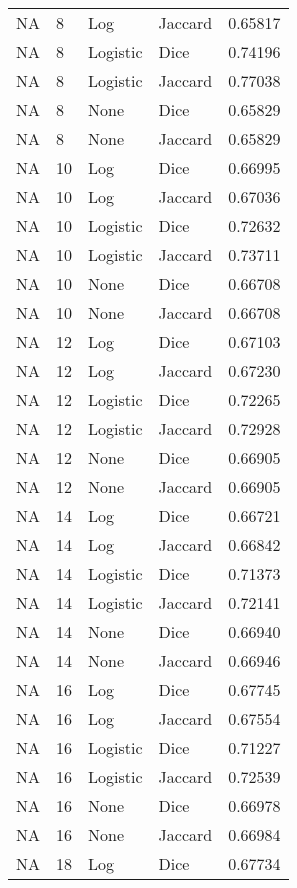 \documentclass{article}
\begin{document}
\begin{center}
\begin{supertabular}{| l | l | l | l | l |}
            NA & 8 & Log & Jaccard & 0.65817 \\
            NA & 8 & Logistic & Dice & 0.74196 \\
            NA & 8 & Logistic & Jaccard & 0.77038 \\
            NA & 8 & None & Dice & 0.65829 \\
            NA & 8 & None & Jaccard & 0.65829 \\
            NA & 10 & Log & Dice & 0.66995 \\
            NA & 10 & Log & Jaccard & 0.67036 \\
            NA & 10 & Logistic & Dice & 0.72632 \\
            NA & 10 & Logistic & Jaccard & 0.73711 \\
            NA & 10 & None & Dice & 0.66708 \\
            NA & 10 & None & Jaccard & 0.66708 \\
            NA & 12 & Log & Dice & 0.67103 \\
            NA & 12 & Log & Jaccard & 0.67230 \\
            NA & 12 & Logistic & Dice & 0.72265 \\
            NA & 12 & Logistic & Jaccard & 0.72928 \\
            NA & 12 & None & Dice & 0.66905 \\
            NA & 12 & None & Jaccard & 0.66905 \\
            NA & 14 & Log & Dice & 0.66721 \\
            NA & 14 & Log & Jaccard & 0.66842 \\
            NA & 14 & Logistic & Dice & 0.71373 \\
            NA & 14 & Logistic & Jaccard & 0.72141 \\
            NA & 14 & None & Dice & 0.66940 \\
            NA & 14 & None & Jaccard & 0.66946 \\
            NA & 16 & Log & Dice & 0.67745 \\
            NA & 16 & Log & Jaccard & 0.67554 \\
            NA & 16 & Logistic & Dice & 0.71227 \\
            NA & 16 & Logistic & Jaccard & 0.72539 \\
            NA & 16 & None & Dice & 0.66978 \\
            NA & 16 & None & Jaccard & 0.66984 \\
            NA & 18 & Log & Dice & 0.67734 \\

\end{supertabular}
\end{center}
\end{document}
